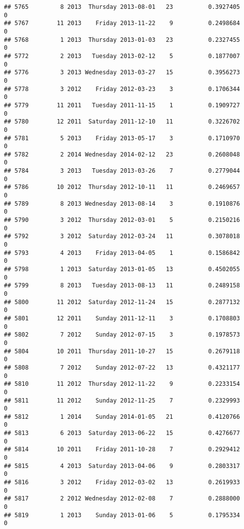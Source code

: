 \documentclass[
]{article}
\begin{document}
\begin{verbatim}
## 5765         8 2013  Thursday 2013-08-01   23          0.3927405             0
## 5767        11 2013    Friday 2013-11-22    9          0.2498684             0
## 5768         1 2013  Thursday 2013-01-03   23          0.2327455             0
## 5772         2 2013   Tuesday 2013-02-12    5          0.1877007             0
## 5776         3 2013 Wednesday 2013-03-27   15          0.3956273             0
## 5778         3 2012    Friday 2012-03-23    3          0.1706344             0
## 5779        11 2011   Tuesday 2011-11-15    1          0.1909727             0
## 5780        12 2011  Saturday 2011-12-10   11          0.3226702             0
## 5781         5 2013    Friday 2013-05-17    3          0.1710970             0
## 5782         2 2014 Wednesday 2014-02-12   23          0.2608048             0
## 5784         3 2013   Tuesday 2013-03-26    7          0.2779044             0
## 5786        10 2012  Thursday 2012-10-11   11          0.2469657             0
## 5789         8 2013 Wednesday 2013-08-14    3          0.1910876             0
## 5790         3 2012  Thursday 2012-03-01    5          0.2150216             0
## 5792         3 2012  Saturday 2012-03-24   11          0.3078018             0
## 5793         4 2013    Friday 2013-04-05    1          0.1586842             0
## 5798         1 2013  Saturday 2013-01-05   13          0.4502055             0
## 5799         8 2013   Tuesday 2013-08-13   11          0.2489158             0
## 5800        11 2012  Saturday 2012-11-24   15          0.2877132             0
## 5801        12 2011    Sunday 2011-12-11    3          0.1708803             0
## 5802         7 2012    Sunday 2012-07-15    3          0.1978573             0
## 5804        10 2011  Thursday 2011-10-27   15          0.2679118             0
## 5808         7 2012    Sunday 2012-07-22   13          0.4321177             0
## 5810        11 2012  Thursday 2012-11-22    9          0.2233154             0
## 5811        11 2012    Sunday 2012-11-25    7          0.2329993             0
## 5812         1 2014    Sunday 2014-01-05   21          0.4120766             0
## 5813         6 2013  Saturday 2013-06-22   15          0.4276677             0
## 5814        10 2011    Friday 2011-10-28    7          0.2929412             0
## 5815         4 2013  Saturday 2013-04-06    9          0.2803317             0
## 5816         3 2012    Friday 2012-03-02   13          0.2619933             0
## 5817         2 2012 Wednesday 2012-02-08    7          0.2888000             0
## 5819         1 2013    Sunday 2013-01-06    5          0.1795334             0

\end{verbatim}
\end{document}
